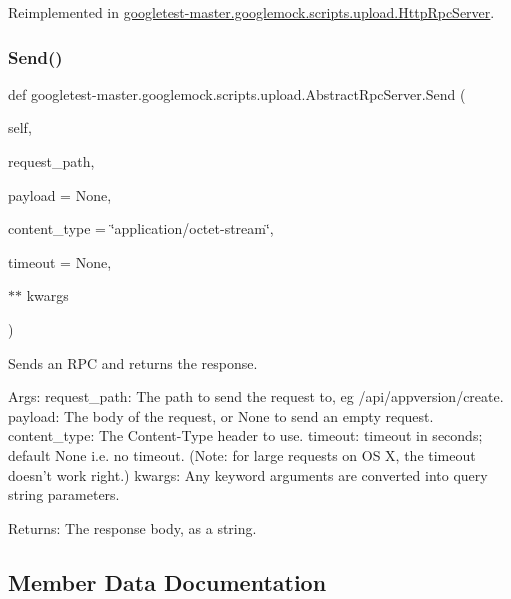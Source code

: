 Reimplemented in \mbox{\hyperlink{classgoogletest-master_1_1googlemock_1_1scripts_1_1upload_1_1_http_rpc_server_ac57e60db325e4eb4e75eac9cd6152eeb}{googletest-\/master.\+googlemock.\+scripts.\+upload.\+Http\+Rpc\+Server}}.

\mbox{\label{classgoogletest-master_1_1googlemock_1_1scripts_1_1upload_1_1_abstract_rpc_server_afc2f51f5c9a7503f0dda5c723ab869fd}} 
\subsubsection{\texorpdfstring{Send()}{Send()}}
{\footnotesize\ttfamily def googletest-\/master.\+googlemock.\+scripts.\+upload.\+Abstract\+Rpc\+Server.\+Send (\begin{DoxyParamCaption}\item[{}]{self,  }\item[{}]{request\+\_\+path,  }\item[{}]{payload = {\ttfamily None},  }\item[{}]{content\+\_\+type = {\ttfamily \char`\"{}application/octet-\/stream\char`\"{}},  }\item[{}]{timeout = {\ttfamily None},  }\item[{$\ast$$\ast$}]{kwargs }\end{DoxyParamCaption})}

\begin{DoxyVerb}Sends an RPC and returns the response.

Args:
  request_path: The path to send the request to, eg /api/appversion/create.
  payload: The body of the request, or None to send an empty request.
  content_type: The Content-Type header to use.
  timeout: timeout in seconds; default None i.e. no timeout.
(Note: for large requests on OS X, the timeout doesn't work right.)
  kwargs: Any keyword arguments are converted into query string parameters.

Returns:
  The response body, as a string.
\end{DoxyVerb}
 

\subsection{Member Data Documentation}
\mbox{\label{classgoogletest-master_1_1googlemock_1_1scripts_1_1upload_1_1_abstract_rpc_server_a8ce5357a1fae257835ba640c0b7ff708}} 
